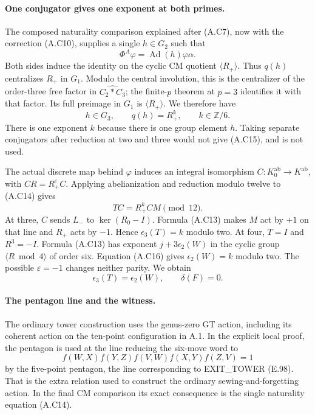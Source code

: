 \paragraph{One conjugator gives one exponent at both primes.}
The composed naturality comparison explained after (A.C7), now
with the correction (A.C10), supplies a single $h\in G_2$ such
that
\[
                  \Phi^A\varphi
                   =\operatorname{Ad}(h)\varphi\alpha.
 \tag{A.C14}
\]
Both sides induce the identity on the cyclic CM quotient
$\langle R_+\rangle$. Thus $q(h)$ centralizes $R_+$ in $G_1$.
Modulo the central involution, this is the centralizer of the
order-three free factor in $\widehat{C_2*C_3}$; the finite-$p$
theorem at $p=3$ identifies it with that factor. Its full preimage
in $G_1$ is $\langle R_+\rangle$. We therefore have
\[
                 h\in G_3,\qquad q(h)=R_+^k,\qquad k\in\mathbb Z/6.
 \tag{A.C15}
\]
There is one exponent $k$ because there is one group element $h$.
Taking separate conjugators after reduction at two and three would
not give (A.C15), and is not used.

The actual discrete map behind $\varphi$ induces an integral
isomorphism $C:K_0^{\mathrm{ab}}\to K^{\mathrm{ab}}$, with
$CR=R_+^{\varepsilon}C$. Applying abelianization and reduction
modulo twelve to (A.C14) gives
\[
                         TC=R_+^kCM\pmod {12}.
 \tag{A.C16}
\]
At three, $C$ sends $L_-$ to $\ker(R_0-I)$. Formula (A.C13)
makes $M$ act by $+1$ on that line and $R_+$ acts by $-1$.
Hence $\epsilon_3(T)=k$ modulo two. At four, $T=I$ and
$R^3=-I$. Formula (A.C13) has exponent $j+3\epsilon_2(W)$ in
the cyclic group $\langle R\bmod4\rangle$ of order six.
Equation (A.C16) gives $\epsilon_2(W)=k$ modulo two.
The possible $\varepsilon=-1$ changes neither parity. We obtain
\[
                   \epsilon_3(T)=\epsilon_2(W),\qquad\delta(F)=0.
 \tag{A.C17}
\]

\paragraph{The pentagon line and the witness.}
The ordinary tower construction uses the genus-zero GT action,
including its coherent action on the ten-point configuration in
A.1. In the explicit local proof, the pentagon is used at the
line reducing the six-move word to
\[
 f(W,X)f(Y,Z)f(V,W)f(X,Y)f(Z,V)=1
\]
by the five-point pentagon, the line corresponding to EXIT\_TOWER
(E.98). That is the extra relation used to construct the ordinary
sewing-and-forgetting action. In the final CM comparison its exact
consequence is the single naturality equation (A.C14).

